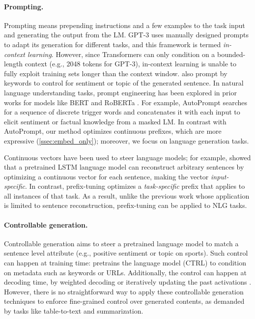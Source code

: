 \paragraph{Prompting.} 

Prompting means prepending instructions and a few examples to the task input and generating the output from the LM. GPT-3 \cite{brown2020language} uses manually designed prompts to adapt its generation for different tasks, and this framework is termed \emph{in-context learning}. However, since Transformers can only condition on a bounded-length context (e.g., 2048 tokens for GPT-3), in-context learning is unable to fully exploit training sets longer than the context window. 
\citet{sun2020conditioned} also prompt by keywords to control for sentiment or topic of the generated sentence. In natural language understanding tasks, prompt engineering has been explored in prior works for models like BERT and RoBERTa \citep{liu-etal-roberta, jiang-etal-2020-know, schick2020exploiting}. For example, AutoPrompt \cite{shin2020autoprompt} searches for a sequence of discrete trigger words and concatenates it with each input to elicit sentiment or factual knowledge from a masked LM. In contrast with AutoPrompt, our method optimizes continuous prefixes, which are more expressive (\ref{ssec:embed_only}); moreover, we focus on language generation tasks. 

Continuous vectors have been used to steer language models; for example, \citet{subramani2020unconditional} showed that a pretrained LSTM language model can reconstruct arbitrary sentences by optimizing a continuous vector for each sentence, making the vector \emph{input-specific}. In contrast, prefix-tuning optimizes a \emph{task-specific} prefix that applies to all instances of that task. As a result, unlike the previous work whose application is limited to sentence reconstruction, prefix-tuning can be applied to NLG tasks. 

\paragraph{Controllable generation.} Controllable generation aims to steer a pretrained language model to match a sentence level attribute (e.g., positive sentiment or topic on sports). Such control can happen at training time: \citet{Keskar2019CTRL} pretrains the language model (CTRL) to condition on metadata such as keywords or URLs. Additionally, the control can happen at decoding time, by weighted decoding \citep[GeDi,][]{KrauseGeDi2020} or iteratively updating the past activations \citep[PPLM,][]{Dathathri2020Plug}. 
 However, there is no straightforward way to apply these controllable generation techniques to enforce fine-grained control over generated contents, as demanded by tasks like table-to-text and summarization.

